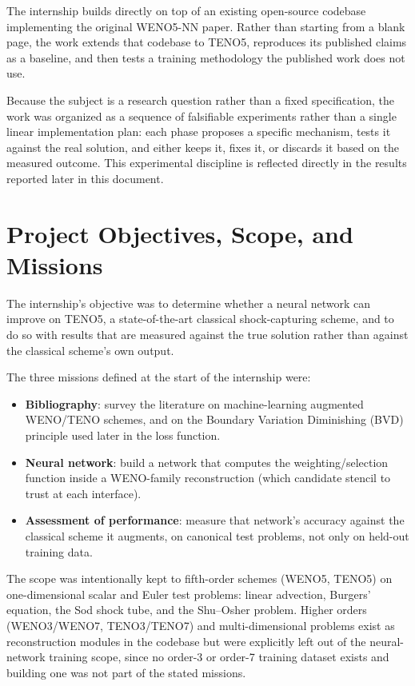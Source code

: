 \documentclass[11pt]{article}
\begin{document}
The internship builds directly on top of an existing open-source codebase
implementing the original WENO5-NN paper. Rather than starting from a blank
page, the work extends that codebase to TENO5, reproduces its published
claims as a baseline, and then tests a training methodology the published
work does not use.

Because the subject is a research question rather than a fixed
specification, the work was organized as a sequence of falsifiable
experiments rather than a single linear implementation plan: each phase
proposes a specific mechanism, tests it against the real solution, and
either keeps it, fixes it, or discards it based on the measured outcome.
This experimental discipline is reflected directly in the results reported
later in this document.

\section{Project Objectives, Scope, and Missions}

The internship's objective was to determine whether a neural network can
improve on TENO5, a state-of-the-art classical shock-capturing scheme, and
to do so with results that are measured against the true solution rather
than against the classical scheme's own output.

The three missions defined at the start of the internship were:

\begin{itemize}
    \item \textbf{Bibliography}: survey the literature on machine-learning
    augmented WENO/TENO schemes, and on the Boundary Variation Diminishing
    (BVD) principle used later in the loss function.
    \item \textbf{Neural network}: build a network that computes the
    weighting/selection function inside a WENO-family reconstruction
    (which candidate stencil to trust at each interface).
    \item \textbf{Assessment of performance}: measure that network's
    accuracy against the classical scheme it augments, on canonical test
    problems, not only on held-out training data.
\end{itemize}

The scope was intentionally kept to fifth-order schemes (WENO5, TENO5) on
one-dimensional scalar and Euler test problems: linear advection, Burgers'
equation, the Sod shock tube, and the Shu--Osher problem. Higher orders
(WENO3/WENO7, TENO3/TENO7) and multi-dimensional problems exist as
reconstruction modules in the codebase but were explicitly left out of the
neural-network training scope, since no order-3 or order-7 training dataset
exists and building one was not part of the stated missions.
\end{document}
